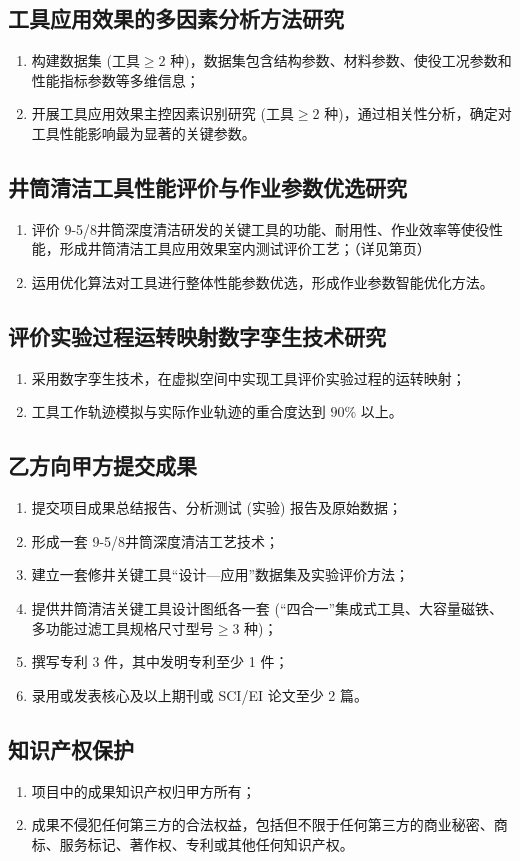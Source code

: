 \subsection{工具应用效果的多因素分析方法研究}
\begin{enumerate}[label=(\arabic*),leftmargin=2em,itemsep=0pt]
\item 构建数据集 (工具$\ge 2$ 种)，数据集包含结构参数、材料参数、使役工况参数和性能指标参数等多维信息；
\item 开展工具应用效果主控因素识别研究 (工具$\ge 2$ 种)，通过相关性分析，确定对工具性能影响最为显著的关键参数。
\end{enumerate}

\subsection{井筒清洁工具性能评价与作业参数优选研究}
\begin{enumerate}[label=(\arabic*),leftmargin=2em,itemsep=0pt]
\item 评价 9-5/8\inch  井筒深度清洁研发的关键工具的功能、耐用性、作业效率等使役性能，形成井筒清洁工具应用效果室内测试评价工艺；（详见第\pageref{sec:r46-5.1}页）
\item 运用优化算法对工具进行整体性能参数优选，形成作业参数智能优化方法。
\end{enumerate}

\subsection{评价实验过程运转映射数字孪生技术研究}
\begin{enumerate}[label=(\arabic*),leftmargin=2em,itemsep=0pt]
\item 采用数字孪生技术，在虚拟空间中实现工具评价实验过程的运转映射；
\item 工具工作轨迹模拟与实际作业轨迹的重合度达到 $90\%$ 以上。
\end{enumerate}

\subsection{乙方向甲方提交成果}
\begin{enumerate}[label=(\arabic*),leftmargin=2em,itemsep=0pt]
\item 提交项目成果总结报告、分析测试 (实验) 报告及原始数据；
\item 形成一套 9-5/8\inch  井筒深度清洁工艺技术；
\item 建立一套修井关键工具“设计—应用”数据集及实验评价方法；
\item 提供井筒清洁关键工具设计图纸各一套 (“四合一”集成式工具、大容量磁铁、多功能过滤工具规格尺寸型号$\ge 3$ 种)；
\item 撰写专利 3 件，其中发明专利至少 1 件；
\item 录用或发表核心及以上期刊或 SCI/EI 论文至少 2 篇。
\end{enumerate}

\subsection{知识产权保护}
\begin{enumerate}[label=(\arabic*),leftmargin=2em,itemsep=0pt]
\item 项目中的成果知识产权归甲方所有；
\item 成果不侵犯任何第三方的合法权益，包括但不限于任何第三方的商业秘密、商标、服务标记、著作权、专利或其他任何知识产权。
\end{enumerate}